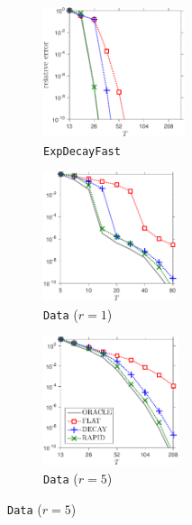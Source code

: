 \documentclass[final]{siamart1116}
\numberwithin{equation}{section}
\numberwithin{theorem}{section}
\numberwithin{figure}{section}
\begin{document}
\begin{figure}[htp!]
\begin{center}
\begin{subfigure}{.325\textwidth}
\begin{center}
\includegraphics[height=1.5in]{figures/EFAST.pdf}
\caption{\texttt{ExpDecayFast}}
\label{fig:EFAST-theory}
\end{center}
\end{subfigure}
\begin{subfigure}{.325\textwidth}
\begin{center}
\includegraphics[height=1.5in]{figures/DATA1.pdf}
\caption{\texttt{Data} ($r = 1$)}
\label{fig:DATA1-theory}
\end{center}
\end{subfigure}
\begin{subfigure}{.325\textwidth}
\begin{center}
\includegraphics[height=1.5in]{figures/DATA5.pdf}
\caption{\texttt{Data} ($r = 5$)}
\label{fig:DATA5-theory}
\end{center}
\end{subfigure}
\end{center}



\end{figure}
\end{document}
